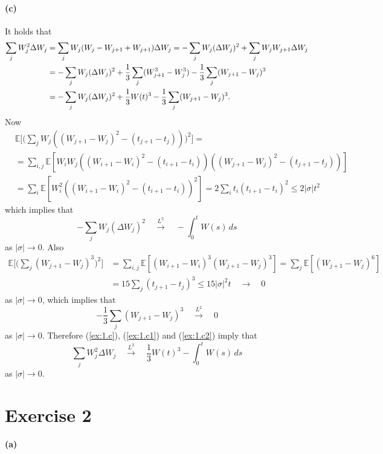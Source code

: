 \documentclass[a4paper,11pt]{article}
\theoremstyle{definition}
\theoremstyle{plain}
\theoremstyle{remark}
\begin{document}
\paragraph*{(c)}

It holds that
\begin{align}
\sum_j W_j^2\Delta W_j & = \sum_jW_j(W_j - W_{j+1} + W_{j+1})\Delta W_j = - \sum_jW_j(\Delta W_j)^2 + \sum_j W_j W_{j+1}\Delta W_j \notag \\ & =  - \sum_jW_j(\Delta W_j)^2 + \frac{1}{3}\sum_j(W^3_{j+1}-W^3_j) -\frac{1}{3}\sum_j(W_{j+1}-W_j)^3 \notag \\ & =  - \sum_jW_j(\Delta W_j)^2 + \frac{1}{3}W(t)^3 -\frac{1}{3}\sum_j(W_{j+1}-W_j)^3. \label{ex:1.c}
\end{align}
Now 
\begin{align*}
& \mathbb{E}\Big[\Big(\sum_jW_j((W_{j+1}-W_j)^2-(t_{j+1}-t_j))\Big)^2\Big] = \\ & = \sum_{i,j}\mathbb{E}[W_iW_j((W_{i+1}-W_i)^2-(t_{i+1}-t_i))((W_{j+1}-W_j)^2-(t_{j+1}-t_j))] \\ & = \sum_i\mathbb{E}[W_i^2((W_{i+1}-W_i)^2-(t_{i+1}-t_i))^2] = 2\sum_i t_i(t_{i+1}-t_i)^2 \leq 2|\sigma|t^2 
\end{align*}
which implies that
\begin{equation}\label{ex:1.c1}
- \sum_jW_j(\Delta W_j)^2 \quad\xrightarrow{L^2}\quad -\int_0^t W(s)\,ds
\end{equation}
as $|\sigma|\to0$. Also
\begin{align*}
\mathbb{E}\Big[\Big(\sum_j(W_{j+1}-W_j)^3\Big)^2\Big] & = \sum_{i,j}\mathbb{E}[(W_{i+1}-W_i)^3(W_{j+1}-W_j)^3] = \sum_{j}\mathbb{E}[(W_{j+1}-W_j)^6] \\ & = 15\sum_j(t_{j+1}-t_j)^3 \leq 15|\sigma|^2t \quad\rightarrow\quad 0 
\end{align*}
as $|\sigma|\to0$, which implies that
\begin{equation}\label{ex:1.c2}
-\frac{1}{3}\sum_j(W_{j+1}-W_j)^3 \quad\xrightarrow{L^2}\quad 0
\end{equation}
as $|\sigma|\to0$.
Therefore (\ref{ex:1.c}), (\ref{ex:1.c1}) and (\ref{ex:1.c2}) imply that
$$
\sum_j W_j^2\Delta W_j \quad\xrightarrow{L^2}\quad \frac{1}{3}W(t)^3 -\int_0^t W(s)\,ds
$$
as $|\sigma|\to0$.

\section*{Exercise 2}

\paragraph*{(a)} 
\end{document}
